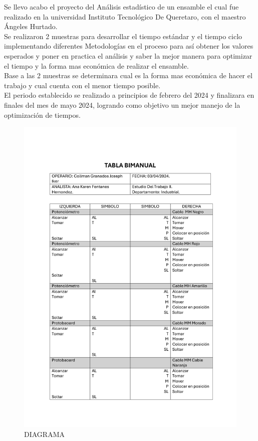     Se llevo acabo el proyecto del Análisis estadístico de un  ensamble el cual fue realizado en la universidad Instituto Tecnológico De Queretaro, con el maestro Ángeles Hurtado.\\ Se realizaron 2 muestras para desarrollar el tiempo estándar y el tiempo ciclo implementando diferentes Metodologías en el proceso para así obtener los valores esperados y poner en practica el análisis y saber la mejor manera para optimizar el tiempo y la forma mas económica de realizar el ensamble.\\
    Base a las 2 muestras se determinara cual es la forma mas económica de hacer el trabajo y cual cuenta con el menor tiempo posible. \\
    El periodo establecido se realizado a principios de febrero del 2024 y finalizara en finales del mes de mayo 2024, logrando como objetivo un mejor manejo de la optimización de tiempos.
    \begin{figure}[H]
        \centering
        \includegraphics[scale=0.3]{9/Img/tablaBimanual.pdf}
        \caption{DIAGRAMA}
        \label{fig:mapa-itq}
    \end{figure}
